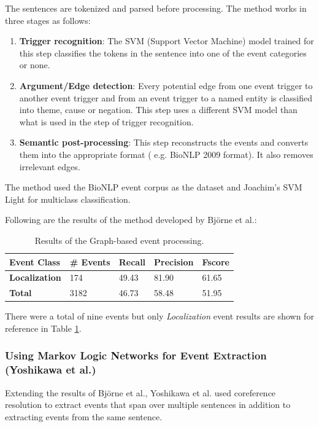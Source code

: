 The sentences are tokenized and parsed before processing. The method works in three stages as follows: 

\begin{enumerate}
\item \textbf{Trigger recognition}: The SVM (Support Vector Machine) model trained for this step classifies the tokens in the sentence into one of the event categories or none.

\item \textbf{Argument/Edge detection}: Every potential edge from one event trigger to another event trigger and from an event trigger to a named entity is classified into theme, cause or negation. This step uses a different SVM model than what is used in the step of trigger recognition.

\item \textbf{Semantic post-processing}: This step reconstructs the events and converts them into the appropriate format ( e.g. BioNLP 2009 format). It also removes irrelevant edges. 
\end{enumerate}

The method used the BioNLP event corpus as the dataset and Joachim's SVM Light \cite{bjorne2009extracting} for multiclass classification. 

Following are the results of the method developed by Björne et al.:

\begin{table}[h]
\centering
\begin{tabular}{|l|l|l|l|l|}
\hline
\textbf{Event Class} & \textbf{\# Events} & \textbf{Recall} & \textbf{Precision} & \textbf{Fscore} \\ \hline
\textbf{Localization} & 174 & 49.43 & 81.90 & 61.65 \\
\textbf{Total} & 3182 & 46.73 & 58.48 & 51.95\\ \hline
\end{tabular}
\caption{Results of the Graph-based event processing.}\label{tab:Jari}
\end{table}

There were a total of nine events but only \textit{Localization} event results are shown for reference in Table \ref{tab:Jari}.

\subsubsection{Using Markov Logic Networks for Event Extraction (Yoshikawa et al.)}

Extending the results of Björne et al., Yoshikawa et al. \cite{yoshikawa2011coreference} used coreference resolution to extract events that span over multiple sentences in addition to extracting events from the same sentence. 

